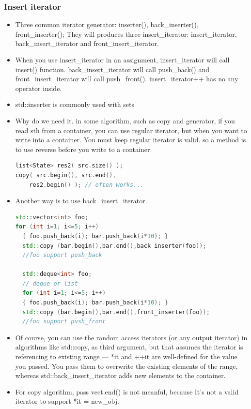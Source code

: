\documentclass[a4paper,12pt,twoside]{book}
\begin{document}
\subsubsection{Insert iterator}
\begin{itemize}
\item Three common iterator generator: inserter(), back\_inserter(), front\_inserter();  They will produces three insert\_iterator: insert\_iterator, back\_insert\_iterator and front\_insert\_iterator.

\item When you use insert\_iterator in an assignment, insert\_iterator will call insert() function.  back\_insert\_iterator will call push\_back() and front\_insert\_iterator will call push\_front(). insert\_iterator++ has no any operator inside.

\item  std::inserter is commonly used with sets

\item Why do we need it. in some algorithm, such as copy and generator, if you read sth from a container, you can use regular iterator, but when you want to write into a container.  You must keep regular iterator is valid. so a method is to use reverse before you write to a container.

\begin{lstlisting}[frame=single, language=c++]
list<State> res2( src.size() );
copy( src.begin(), src.end(),
    res2.begin() ); // often works...
\end{lstlisting}

\item Another way is to use back\_insert\_iterator.
\begin{lstlisting}[frame=single, language=c++]
std::vector<int> foo;
for (int i=1; i<=5; i++)
  { foo.push_back(i); bar.push_back(i*10); }
  std::copy (bar.begin(),bar.end(),back_inserter(foo));
  //foo support push_back

  std::deque<int> foo;
  // deque or list
  for (int i=1; i<=5; i++)
  { foo.push_back(i); bar.push_back(i*10); }
  std::copy (bar.begin(),bar.end(),front_inserter(foo));
  //foo support push_front
\end{lstlisting}

\item Of course, you can use the random access iterators (or any output iterator) in algorithms like std::copy, as third argument, but that assumes the iterator is referencing to existing range — *it and ++it are well-defined for the value you passed. You pass them to overwrite the existing elements of the range, whereas std::back\_insert\_iterator adds new elements to the container.

\item For copy algorithm, pass vect.end() is not meanful, because It's not a valid iterator to support *it = new\_obj.

\end{itemize}
\end{document}
